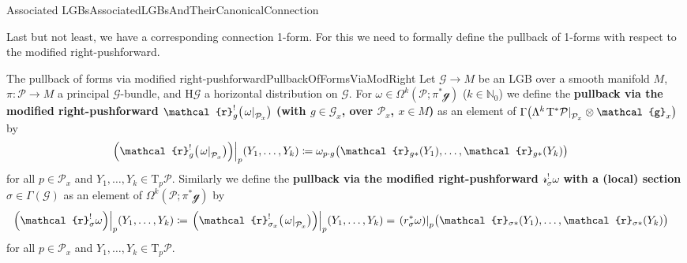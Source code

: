\documentclass[reqno,a4paper,oneside]{amsart}
\theoremstyle{plain}
\theoremstyle{remark}
\theoremstyle{definition}
\begin{document}
\begin{examples}{Associated LGBs}{AssociatedLGBsAndTheirCanonicalConnection}
%
\end{examples}

Last but not least, we have a corresponding connection 1-form. For this we need to formally define the pullback of 1-forms with respect to the modified right-pushforward.

\begin{definitions}{The pullback of forms via modified right-pushforward}{PullbackOfFormsViaModRight}
Let $\mathcal{G} \to M$ be an LGB over a smooth manifold $M$, $\pi\colon\mathcal{P} \to M$ a principal $\mathcal{G}$-bundle, and $\mathrm{H}\mathcal{G}$ a horizontal distribution on $\mathcal{G}$. For $\omega \in \Omega^k(\mathcal{P}; \pi^*\mathcal{g})$ ($k \in \mathbb{N}_0$) we define the \textbf{pullback via the modified right-pushforward $\mathcal{r}_g^!\mleft(\mleft.\omega\mright|_{\mathcal{P}_x}\mright)$ (with $g\in\mathcal{G}_x$, over $\mathcal{P}_x$, $x \in M$)} as an element of $\Gamma \mleft( \Lambda^k\mleft.\mathrm{T}^*\mathcal{P}\mright|_{\mathcal{P}_x} \otimes \mathcal{g}_x \mright)$ by
\begin{align*}
\mleft.\mleft(\mathcal{r}_g^!\mleft(\mleft.\omega\mright|_{\mathcal{P}_x}\mright)\mright)\mright|_p \mleft( Y_1, \dotsc, Y_k\mright)
&\coloneqq
\omega_{p \cdot g} \bigl( \mathcal{r}_{g*}(Y_1), \dotsc, \mathcal{r}_{g*}(Y_k)\bigr)
\end{align*}
for all $p \in \mathcal{P}_x$ and $Y_1, \dotsc, Y_k \in \mathrm{T}_p\mathcal{P}$. Similarly we define the \textbf{pullback via the modified right-pushforward $\mathcal{r}^!_{\sigma}\omega$ with a (local) section $\sigma \in \Gamma(\mathcal{G})$} as an element of $\Omega^k(\mathcal{P}; \pi^*\mathcal{g})$ by 
\begin{align*}
\mleft.\mleft(\mathcal{r}_\sigma^!\omega\mright)\mright|_p \mleft( Y_1, \dotsc, Y_k\mright)
&\coloneqq
\mleft.\mleft(\mathcal{r}_{\sigma_x}^!\mleft(\mleft.\omega\mright|_{\mathcal{P}_x}\mright)\mright)\mright|_p \mleft( Y_1, \dotsc, Y_k\mright)
=
\mleft.\mleft(r_\sigma^*\omega\mright)\mright|_{p} \bigl( \mathcal{r}_{\sigma*}(Y_1), \dotsc, \mathcal{r}_{\sigma*}(Y_k)\bigr)
\end{align*}
for all $p \in \mathcal{P}_x$ and $Y_1, \dotsc, Y_k \in \mathrm{T}_p\mathcal{P}$.
\end{definitions}
\end{document}
